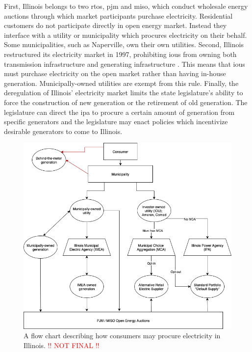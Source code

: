First, Illinois belongs to two \acp{rto}, \ac{pjm} and \ac{miso}, which conduct
wholesale energy auctions through which market participants purchase
electricity. Residential customers do not participate directly in open energy
market. Instead they interface with a utility or municipality which procures
electricity on their behalf. Some municipalities, such as Naperville, own their
own utilities. Second, Illinois restructured its electricity market in 1997,
prohibiting \aclp{iou} from owning both transmission infrastructure and
generating infrastructure \cite{illinois_90th_general_assembly_electric_1997}.
This means that \acp{iou} must purchase electricity on the open market rather
than having in-house generation. Municipally-owned utilities are exempt from
this rule. Finally, the deregulation of Illinois' electricity market limits the
state legislature's ability to force the construction of new generation or the
retirement of old generation. The legislature can direct the \ac{ipa} to procure
a certain amount of generation from specific generators and the legislature may
enact policies which incentivize desirable generators to come to Illinois.


\begin{figure}[ht!]
    \centering
    \includegraphics[width=0.75\columnwidth]{figures/07_interview_chapter/illinois-electric-choice.drawio.png}
    \caption{A flow chart describing how consumers may procure electricity in
    Illinois. \textcolor{red}{!! NOT FINAL !!}}
    \label{fig:illinois-flow-chart}
\end{figure}

